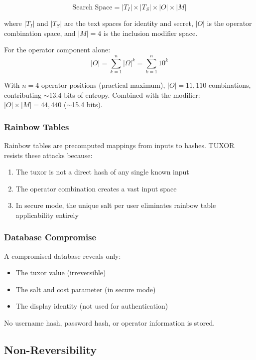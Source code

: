 \documentclass[11pt,a4paper]{article}
\begin{document}
\begin{equation}
\text{Search Space} = |T_I| \times |T_S| \times |O| \times |M|
\end{equation}

where $|T_I|$ and $|T_S|$ are the text spaces for identity and secret, $|O|$ is the operator combination space, and $|M| = 4$ is the inclusion modifier space.

For the operator component alone:
\begin{equation}
|O| = \sum_{k=1}^{n} |\Omega|^k = \sum_{k=1}^{n} 10^k
\end{equation}

With $n=4$ operator positions (practical maximum), $|O| = 11{,}110$ combinations, contributing $\sim$13.4 bits of entropy. Combined with the modifier: $|O| \times |M| = 44{,}440$ ($\sim$15.4 bits).

\subsubsection{Rainbow Tables}

Rainbow tables are precomputed mappings from inputs to hashes. TUXOR resists these attacks because:
\begin{enumerate}[noitemsep]
  \item The tuxor is not a direct hash of any single known input
  \item The operator combination creates a vast input space
  \item In secure mode, the unique salt per user eliminates rainbow table applicability entirely
\end{enumerate}

\subsubsection{Database Compromise}

A compromised database reveals only:
\begin{itemize}[noitemsep]
  \item The tuxor value (irreversible)
  \item The salt and cost parameter (in secure mode)
  \item The display identity (not used for authentication)
\end{itemize}

No username hash, password hash, or operator information is stored.

\subsection{Non-Reversibility}
\end{document}
